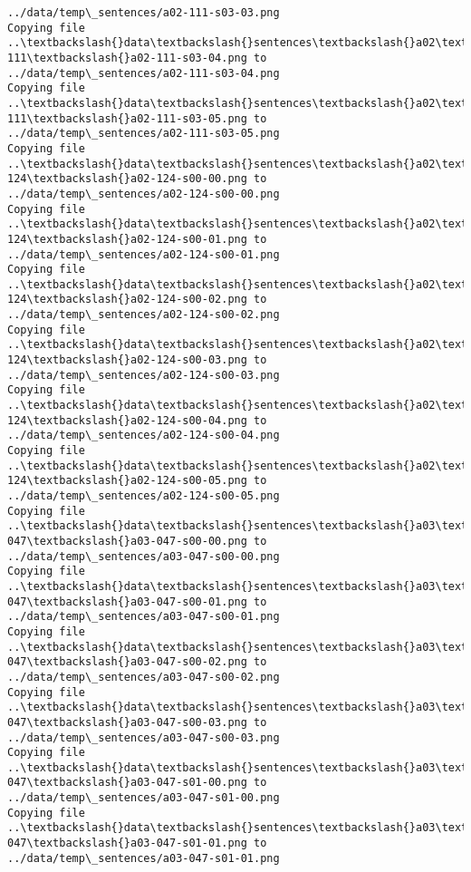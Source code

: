 \documentclass[11pt]{article}
\begin{document}
\begin{Verbatim}[commandchars=\\\{\}]
../data/temp\_sentences/a02-111-s03-03.png
Copying file ..\textbackslash{}data\textbackslash{}sentences\textbackslash{}a02\textbackslash{}a02-111\textbackslash{}a02-111-s03-04.png to
../data/temp\_sentences/a02-111-s03-04.png
Copying file ..\textbackslash{}data\textbackslash{}sentences\textbackslash{}a02\textbackslash{}a02-111\textbackslash{}a02-111-s03-05.png to
../data/temp\_sentences/a02-111-s03-05.png
Copying file ..\textbackslash{}data\textbackslash{}sentences\textbackslash{}a02\textbackslash{}a02-124\textbackslash{}a02-124-s00-00.png to
../data/temp\_sentences/a02-124-s00-00.png
Copying file ..\textbackslash{}data\textbackslash{}sentences\textbackslash{}a02\textbackslash{}a02-124\textbackslash{}a02-124-s00-01.png to
../data/temp\_sentences/a02-124-s00-01.png
Copying file ..\textbackslash{}data\textbackslash{}sentences\textbackslash{}a02\textbackslash{}a02-124\textbackslash{}a02-124-s00-02.png to
../data/temp\_sentences/a02-124-s00-02.png
Copying file ..\textbackslash{}data\textbackslash{}sentences\textbackslash{}a02\textbackslash{}a02-124\textbackslash{}a02-124-s00-03.png to
../data/temp\_sentences/a02-124-s00-03.png
Copying file ..\textbackslash{}data\textbackslash{}sentences\textbackslash{}a02\textbackslash{}a02-124\textbackslash{}a02-124-s00-04.png to
../data/temp\_sentences/a02-124-s00-04.png
Copying file ..\textbackslash{}data\textbackslash{}sentences\textbackslash{}a02\textbackslash{}a02-124\textbackslash{}a02-124-s00-05.png to
../data/temp\_sentences/a02-124-s00-05.png
Copying file ..\textbackslash{}data\textbackslash{}sentences\textbackslash{}a03\textbackslash{}a03-047\textbackslash{}a03-047-s00-00.png to
../data/temp\_sentences/a03-047-s00-00.png
Copying file ..\textbackslash{}data\textbackslash{}sentences\textbackslash{}a03\textbackslash{}a03-047\textbackslash{}a03-047-s00-01.png to
../data/temp\_sentences/a03-047-s00-01.png
Copying file ..\textbackslash{}data\textbackslash{}sentences\textbackslash{}a03\textbackslash{}a03-047\textbackslash{}a03-047-s00-02.png to
../data/temp\_sentences/a03-047-s00-02.png
Copying file ..\textbackslash{}data\textbackslash{}sentences\textbackslash{}a03\textbackslash{}a03-047\textbackslash{}a03-047-s00-03.png to
../data/temp\_sentences/a03-047-s00-03.png
Copying file ..\textbackslash{}data\textbackslash{}sentences\textbackslash{}a03\textbackslash{}a03-047\textbackslash{}a03-047-s01-00.png to
../data/temp\_sentences/a03-047-s01-00.png
Copying file ..\textbackslash{}data\textbackslash{}sentences\textbackslash{}a03\textbackslash{}a03-047\textbackslash{}a03-047-s01-01.png to
../data/temp\_sentences/a03-047-s01-01.png

\end{Verbatim}
\end{document}

